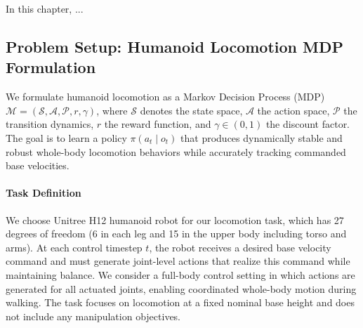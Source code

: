 
In this chapter, ... 

\subsection{Problem Setup: Humanoid Locomotion MDP Formulation}
\label{sec:problem_setup}

We formulate humanoid locomotion as a Markov Decision Process (MDP) $\mathcal{M} = (\mathcal{S}, \mathcal{A}, \mathcal{P}, r, \gamma)$, where $\mathcal{S}$ denotes the state space, $\mathcal{A}$ the action space, $\mathcal{P}$ the transition dynamics, $r$ the reward function, and $\gamma \in (0,1)$ the discount factor. The goal is to learn a policy $\pi(a_t \mid o_t)$ that produces dynamically stable and robust whole-body locomotion behaviors while accurately tracking
commanded base velocities.

\paragraph{Task Definition}
\label{sec:task_def}
We choose Unitree H12 humanoid robot for our locomotion task, which has 27 degrees of freedom (6 in each leg and 15 in the upper body including torso and arms). At each control timestep $t$, the robot receives a desired base velocity command and must generate joint-level actions that realize this command while maintaining balance. We consider a full-body control setting in which actions are generated for all actuated joints, enabling coordinated whole-body motion during walking. The task focuses on locomotion at a fixed nominal base height and does not include any manipulation objectives.

